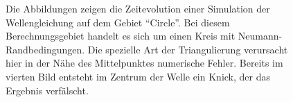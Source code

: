\documentclass[crop=false,10pt,ngerman]{standalone}
\begin{document}
\begin{figure}[h]
\begin{subfigure}[b]{0.24\textwidth}
          \caption{}
        \end{subfigure}
        \caption[Wellensimulation auf einem Kreis]{%
          Die Abbildungen zeigen die Zeitevolution einer Simulation der Wellengleichung auf dem Gebiet \enquote{Circle}.
          Bei diesem Berechnungsgebiet handelt es sich um einen Kreis mit Neumann-Randbedingungen.
          Die spezielle Art der Triangulierung verursacht hier in der Nähe des Mittelpunktes numerische Fehler.
          Bereits im vierten Bild entsteht im Zentrum der Welle ein Knick, der das Ergebnis verfälscht.
        }
        \label{fig:circle-wave}
      \end{figure}

\end{document}
